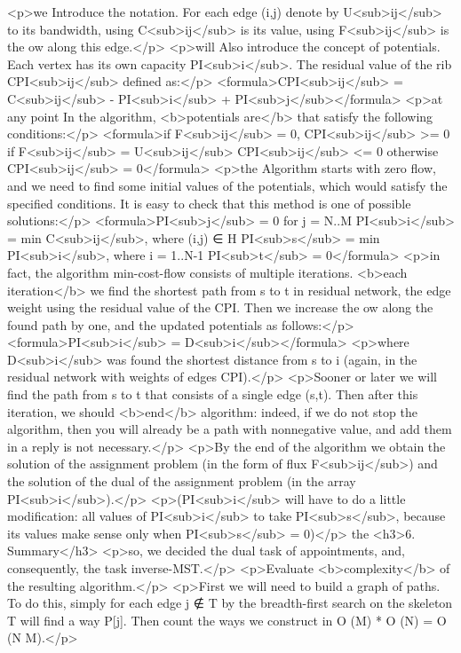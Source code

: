 <p>we Introduce the notation. For each edge (i,j) denote by U<sub>ij</sub> to its bandwidth, using C<sub>ij</sub> is its value, using F<sub>ij</sub> is the ow along this edge.</p>
<p>will Also introduce the concept of potentials. Each vertex has its own capacity PI<sub>i</sub>. The residual value of the rib CPI<sub>ij</sub> defined as:</p>
<formula>CPI<sub>ij</sub> = C<sub>ij</sub> - PI<sub>i</sub> + PI<sub>j</sub></formula>
<p>at any point In the algorithm, <b>potentials are</b> that satisfy the following conditions:</p>
<formula>if F<sub>ij</sub> = 0, CPI<sub>ij</sub> >= 0
if F<sub>ij</sub> = U<sub>ij</sub> CPI<sub>ij</sub> <= 0
otherwise CPI<sub>ij</sub> = 0</formula>
<p>the Algorithm starts with zero flow, and we need to find some initial values of the potentials, which would satisfy the specified conditions. It is easy to check that this method is one of possible solutions:</p>
<formula>PI<sub>j</sub> = 0 for j = N..M
PI<sub>i</sub> = min C<sub>ij</sub>, where (i,j) ∈ H
PI<sub>s</sub> = min PI<sub>i</sub>, where i = 1..N-1
PI<sub>t</sub> = 0</formula>
<p>in fact, the algorithm min-cost-flow consists of multiple iterations. <b>each iteration</b> we find the shortest path from s to t in residual network, the edge weight using the residual value of the CPI. Then we increase the ow along the found path by one, and the updated potentials as follows:</p>
<formula>PI<sub>i</sub> = D<sub>i</sub></formula>
<p>where D<sub>i</sub> was found the shortest distance from s to i (again, in the residual network with weights of edges CPI).</p>
<p>Sooner or later we will find the path from s to t that consists of a single edge (s,t). Then after this iteration, we should <b>end</b> algorithm: indeed, if we do not stop the algorithm, then you will already be a path with nonnegative value, and add them in a reply is not necessary.</p>
<p>By the end of the algorithm we obtain the solution of the assignment problem (in the form of flux F<sub>ij</sub>) and the solution of the dual of the assignment problem (in the array PI<sub>i</sub>).</p>
<p>(PI<sub>i</sub> will have to do a little modification: all values of PI<sub>i</sub> to take PI<sub>s</sub>, because its values make sense only when PI<sub>s</sub> = 0)</p>
the <h3>6. Summary</h3>
<p>so, we decided the dual task of appointments, and, consequently, the task inverse-MST.</p>
<p>Evaluate <b>complexity</b> of the resulting algorithm.</p>
<p>First we will need to build a graph of paths. To do this, simply for each edge j ∉ T by the breadth-first search on the skeleton T will find a way P[j]. Then count the ways we construct in O (M) * O (N) = O (N M).</p>
